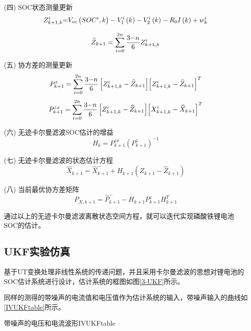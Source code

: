 (四)	SOC状态测量更新
\begin{equation}
Z_{k + 1,k}^i{\rm{ = }}{V_{oc}}\left( {SO{C^i},k} \right) - V_1^i\left( k \right) - V_2^i\left( k \right) - {R_0}I\left( k \right) + w_k^i
\end{equation}

\begin{equation}
{\widehat Z_{k + 1}} = \sum\limits_{i = 0}^{2n} {\frac{{3{\rm{ - }}n}}{6}Z_{k + 1,k}^i} 
\end{equation}

(五)	协方差的测量更新
\begin{equation}
P_{k + 1}^z = \sum\limits_{i = 0}^{2n} {\frac{{3{\rm{ - }}n}}{6}\left[ {Z_{k + 1,k}^i - {{\widehat Z}_{k + 1}}} \right]} {\left[ {Z_{k + 1,k}^i - {{\widehat Z}_{k + 1}}} \right]^T}
\end{equation}
\begin{equation}
P_{k + 1}^{zx} = \sum\limits_{i = 0}^{2n} {\frac{{3{\rm{ - }}n}}{6}\left[ {Z_{k + 1,k}^i - {{\widehat Z}_{k + 1}}} \right]} {\left[ {X_{k + 1,k}^i - {{\widehat X}_{k + 1}}} \right]^T}
\end{equation}

(六)	无迹卡尔曼滤波SOC估计的增益
\begin{equation}
{H_k} = P_{k + 1}^{zx}{\left( {P_{k + 1}^z} \right)^{ - 1}}
\end{equation} 

(七)	无迹卡尔曼滤波的状态估计方程
\begin{equation}
{\widehat X_{k + 1}} = \widehat X_{k + 1}^ -  + {H_{k + 1}}({Z_{k + 1}} - {\widehat Z_{k + 1}})
\end{equation} 

(八)	当前最优协方差矩阵
\begin{equation}
{P_{X,k + 1}} = \widehat P_{k + 1}^ -  - {H_{k + 1}}P_{k + 1}^zH_{k + 1}^T
\end{equation} 

通过以上的无迹卡尔曼滤波离散状态空间方程，就可以迭代实现磷酸铁锂电池SOC的估计。

\subsection{UKF实验仿真}
基于UT变换处理非线性系统的传递问题，并且采用卡尔曼滤波的思想对锂电池的SOC估计系统进行设计，估计系统的框图如图\ref{3-UKF}所示。

同样的测得的带噪声的电流值和电压值作为估计系统的输入，带噪声输入的曲线如\ref{IVUKFtable}所示。
\begin{pics}[htbp]{带噪声的电压和电流波形}{IVUKFtable}
\end{pics}

